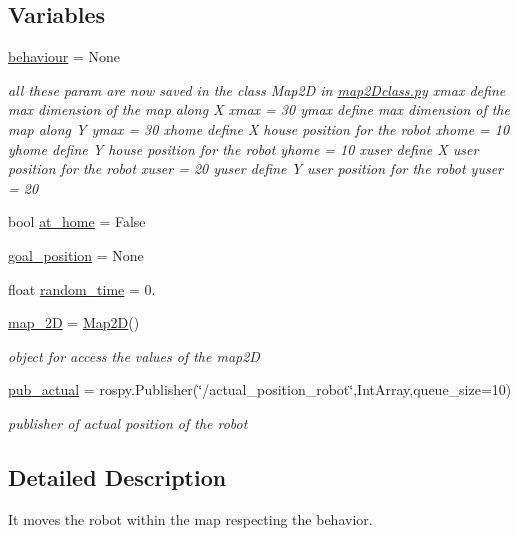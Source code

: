 \subsection*{Variables}
\begin{DoxyCompactItemize}
\item 
\hyperlink{namespacemotion_a15d63b2a70ac940f179085ce72871c86}{behaviour} = None
\begin{DoxyCompactList}\small\item\em all these param are now saved in the class Map2D in \hyperlink{map2Dclass_8py}{map2\+Dclass.\+py} xmax define max dimension of the map along X xmax = 30 ymax define max dimension of the map along Y ymax = 30 xhome define X house position for the robot xhome = 10 yhome define Y house position for the robot yhome = 10 xuser define X user position for the robot xuser = 20 yuser define Y user position for the robot yuser = 20 \end{DoxyCompactList}\item 
bool \hyperlink{namespacemotion_a30e58643e988d1faddb84cdfd54965f8}{at\+\_\+home} = False
\item 
\hyperlink{namespacemotion_a6886ce6765cc301867580755b977136a}{goal\+\_\+position} = None
\item 
float \hyperlink{namespacemotion_a577a5f71c1bdf849f48eed17c4134bee}{random\+\_\+time} = 0.
\item 
\hyperlink{namespacemotion_a858c2a633daaa0a83b599397041f524b}{map\+\_\+2D} = \hyperlink{classmap2Dclass_1_1Map2D}{Map2D}()
\begin{DoxyCompactList}\small\item\em object for access the values of the map2D \end{DoxyCompactList}\item 
\hyperlink{namespacemotion_a9213de80f34f408518c9265ee283b588}{pub\+\_\+actual} = rospy.\+Publisher(\char`\"{}/actual\+\_\+position\+\_\+robot\char`\"{},Int\+Array,queue\+\_\+size=10)
\begin{DoxyCompactList}\small\item\em publisher of actual position of the robot \end{DoxyCompactList}\end{DoxyCompactItemize}


\subsection{Detailed Description}
It moves the robot within the map respecting the behavior. 

